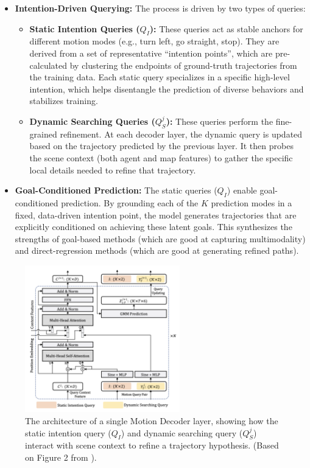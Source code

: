 \begin{itemize}
    \item \textbf{Intention-Driven Querying:} The process is driven by two types of queries:
    \begin{itemize}
        \item \textbf{Static Intention Queries ($Q_I$):} These queries act as stable anchors for different motion modes (e.g., turn left, go straight, stop). They are derived from a set of representative ``intention points'', which are pre-calculated by clustering the endpoints of ground-truth trajectories from the training data. Each static query specializes in a specific high-level intention, which helps disentangle the prediction of diverse behaviors and stabilizes training.
        \item \textbf{Dynamic Searching Queries ($Q_S^j$):} These queries perform the fine-grained refinement. At each decoder layer, the dynamic query is updated based on the trajectory predicted by the previous layer. It then probes the scene context (both agent and map features) to gather the specific local details needed to refine that trajectory.
    \end{itemize}
    \item \textbf{Goal-Conditioned Prediction:} The static queries ($Q_I$) enable goal-conditioned prediction. By grounding each of the $K$ prediction modes in a fixed, data-driven intention point, the model generates trajectories that are explicitly conditioned on achieving these latent goals. This synthesizes the strengths of goal-based methods (which are good at capturing multimodality) and direct-regression methods (which are good at generating refined paths).
\end{itemize}

\begin{figure}[htbp]
    \centering
    \includegraphics[width=0.6\textwidth]{figures/decoder_layer_detail.png}
    \caption{The architecture of a single Motion Decoder layer, showing how the static intention query ($Q_I$) and dynamic searching query ($Q_S^j$) interact with scene context to refine a trajectory hypothesis. (Based on Figure 2 from \cite{Shi2022MTR}).}
    \label{fig:decoder_layer}
\end{figure}

